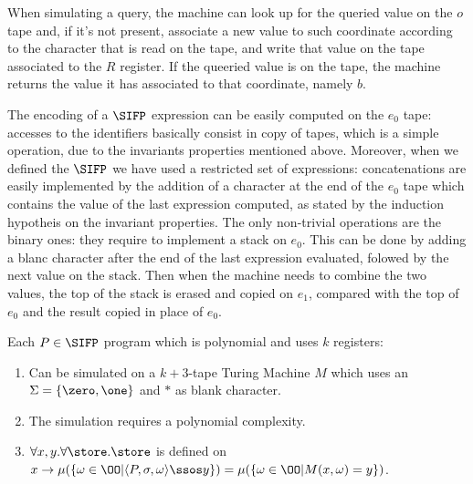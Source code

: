 When simulating a query, the machine can look up for the queried value on the $o$ tape and, if it's not present, associate a new value to such coordinate according to the character that is read on the tape, and write that value on the tape associated to the $R$ register. If the queeried value is on the tape, the machine returns the value it has associated to that coordinate, namely $b$.

The encoding of a $\SIFP$ expression can be easily computed on the $e_0$ tape: accesses to the identifiers basically consist in copy of tapes, which is a simple operation, due to the invariants properties mentioned above. Moreover, when we defined the $\SIFP$ we have used a restricted set of expressions: concatenations are easily implemented by the addition of a character at the end of the $e_0$ tape which contains the value of the last expression computed, as stated by the induction hypotheis on the invariant properties. The only non-trivial operations are the binary ones: they require to implement a stack on $e_0$. This can be done by adding a blanc character after the end of the last expression evaluated, folowed by the next value on the stack. Then when the machine needs to combine the two values, the top of the stack is erased and copied on $e_1$, compared with the top of $e_0$ and the result copied in place of $e_0$.

\begin{prop}
\label{prop:sifptostream}
Each $P \in\SIFP$ program which is polynomial and uses $k$ registers:
\begin{enumerate}
\item Can be simulated on a $k+3$-tape Turing Machine $M$ which uses an $\Sigma=\{\zero, \one\}$ and $*$ as blank character.
\item The simulation requires a polynomial complexity.
\item $\forall x, y.\forall \store.\store$ is defined on $x \to \mu(\{\omega \in \OO | \langle P, \sigma, \omega\rangle \ssos y\})=\mu(\{\omega \in \OO | M(x, \omega)=y\})$.
\end{enumerate}
\end{prop}

